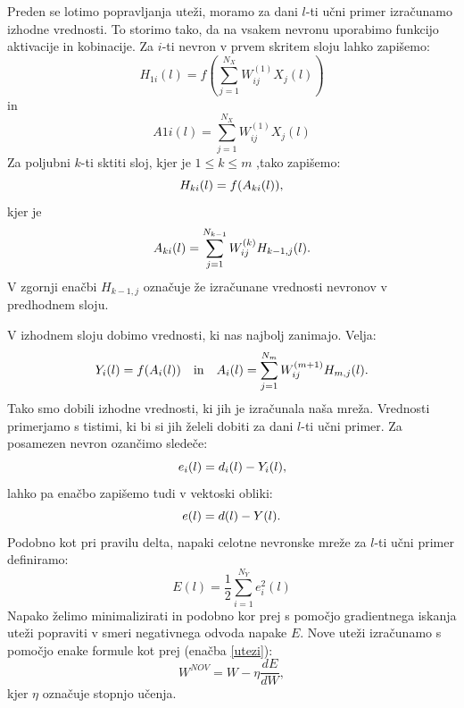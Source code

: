 \documentclass[mat1]{fmfdelo}
\begin{document}
Preden se lotimo popravljanja uteži, moramo za dani $l$-ti učni primer izračunamo izhodne vrednosti. To storimo tako, da na vsakem nevronu uporabimo funkcijo aktivacije in kobinacije. Za $i$-ti nevron v prvem skritem sloju lahko zapišemo:
%
\begin{equation*}
H_{1i}(l) = f\left( \sum^{N_X}_{j=1}{W^{(1)}_{ij}X_j(l)}\right)
\end{equation*}
%
in
%
\begin{equation*}
A{1i}(l) =\sum^{N_X}_{j=1}{W^{(1)}_{ij}X_j(l)}
\end{equation*}
%
Za poljubni $k$-ti sktiti sloj, kjer je $1\leq k \leq m$ ,tako zapišemo:
%
\begin{equation*}
H_{ki}(l) = f(A_{ki}(l))\text,
\end{equation*}
%
kjer je
%
\begin{equation*}
A_{ki}(l) = \sum^{N_{k-1}}_{j=1}W^{(k)}_{ij}H_{k-1,j}(l)\text.
\end{equation*}
%
V zgornji enačbi $H_{k-1,j}$ označuje že izračunane vrednosti nevronov v predhodnem sloju.
 
 V izhodnem sloju dobimo vrednosti, ki nas najbolj zanimajo. Velja:
%
\begin{equation*}
Y_{i}(l) = f(A_{i}(l)) \quad \text{in} \quad A_{i}(l) = \sum^{N_{m}}_{j=1}{W^{(m+1)}_{ij}H_{m,j}(l)}\text.
\end{equation*}
%
Tako smo dobili izhodne vrednosti, ki jih je izračunala naša mreža. Vrednosti primerjamo s tistimi, ki bi si jih želeli dobiti za dani $l$-ti učni primer. Za posamezen nevron ozančimo sledeče:
%
\begin{equation}
e_i(l) = d_i(l) - Y_i(l)\text,
\end{equation}
lahko pa enačbo zapišemo tudi v vektoski obliki:
\begin{equation*}
e(l) = d(l) - Y(l)\text.
\end{equation*}
Podobno kot pri pravilu delta, napaki celotne nevronske mreže za $l$-ti učni primer definiramo:
%
\begin{equation}
E(l) = \frac{1}{2}\sum^{N_Y}_{i=1}e_i^2(l)
\label{napaka}
\end{equation}
%
Napako želimo minimalizirati in podobno kor prej s pomočjo gradientnega iskanja uteži popraviti v smeri negativnega odvoda napake $E$. Nove uteži izračunamo s pomočjo enake formule kot prej (enačba \eqref{utezi}):
\begin{equation*}
W^{NOV} = W - \eta \frac{dE}{dW}, 
\end{equation*}
%
kjer $\eta$ označuje stopnjo učenja. 
\end{document}
